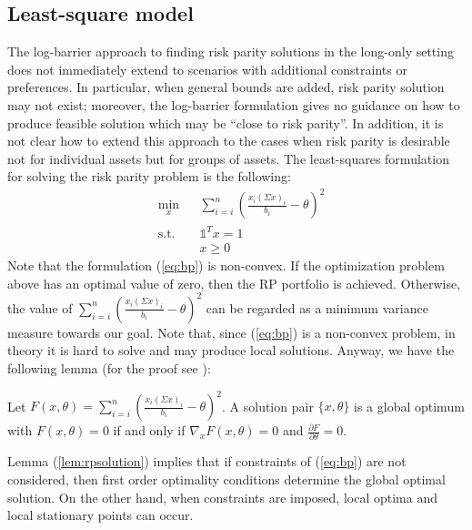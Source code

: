 \subsection{Least-square model}
The log-barrier approach to finding risk parity solutions in the long-only setting does not immediately extend to scenarios with additional constraints or preferences. In particular, when general bounds are added, risk parity solution may not exist; moreover, the log-barrier formulation gives no guidance on how to produce feasible solution which may be “close to risk parity”. In addition, it is not clear how to extend this approach to the cases when risk parity is desirable not for individual assets but for groups of assets. The least-squares formulation for solving the risk parity problem is the following:
\begin{equation}\label{eq:bp}
\begin{aligned}
& \min_x
&& \sum_{i=i}^n \left( \frac{x_i(\Sigma x)_i}{b_i} - \theta \right)^2\\
& \text{s.t.}
&&\mathds{1}^T x =1\\
&&&x \geq 0
\end{aligned}
\end{equation}
Note that the formulation (\ref{eq:bp}) is non-convex.  If the optimization problem above has an optimal value of zero, then the RP portfolio is achieved. Otherwise, the value of $\sum_{i=i}^n \left( \frac{x_i(\Sigma x)_i}{b_i} - \theta\right)^2$  can be regarded as a minimum variance measure towards our goal. Note that, since (\ref{eq:bp}) is a non-convex problem, in theory it is hard to solve and may produce local solutions. Anyway, we have the following lemma (for the proof see \cite{tutuncu}):
\begin{lemma}\label{lem:rpsolution}
Let $F(x,\theta) = \sum_{i=i}^n \left( \frac{x_i(\Sigma x)_i}{b_i} - \theta \right)^2$. A solution pair $\{x,\theta\}$ is a global optimum with $F(x,\theta)=0$ if and only if $\nabla_xF(x,\theta) = 0$ and $\frac{\partial F}{\partial \theta} = 0$.
\end{lemma}
Lemma (\ref{lem:rpsolution}) implies that if constraints of (\ref{eq:bp}) are not considered, then first order optimality conditions determine the global optimal solution. On the other hand, when constraints are imposed, local optima and local stationary points can occur.
